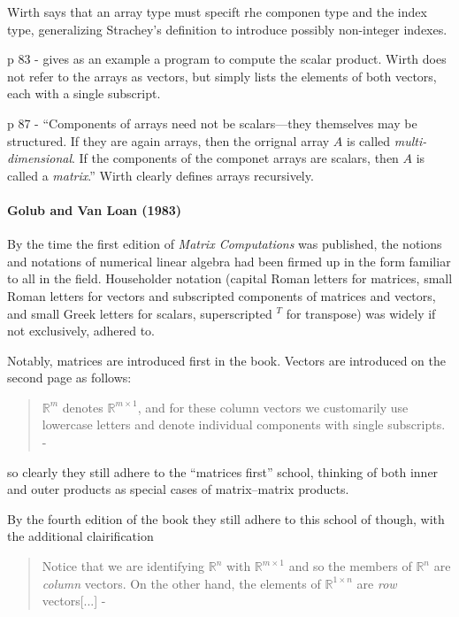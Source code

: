 Wirth says that an array type must specift rhe componen type and the index type,
generalizing Strachey's definition to introduce possibly non-integer indexes.

p 83 - gives as an example a program to compute the scalar product.
Wirth does not refer to the arrays as vectors, but simply lists the elements of
both vectors, each with a single subscript.

p 87 - ``Components of arrays need not be scalars---they themselves may be structured.
If they are again arrays, then the orrignal array $A$ is called \textit{multi-dimensional}.
If the components of the componet arrays are scalars, then
$A$ is called a \textit{matrix}.'' Wirth clearly defines arrays recursively.



\paragraph{Golub and Van Loan (1983)~\cite{Golub1983}}

By the time the first edition of \textit{Matrix Computations} was published,
the notions and notations of numerical linear algebra had been firmed up in the
form familiar to all in the field. Householder notation (capital Roman letters
for matrices, small Roman letters for vectors and subscripted components of matrices and vectors,
and small Greek letters for scalars, superscripted $^T$ for transpose) was widely
if not exclusively, adhered to.

Notably, matrices are introduced first in the book.
Vectors are introduced on the second page as follows:
%
\begin{quote}
$\mathbb R^m$ denotes $\mathbb R^{m\times1}$, and for these column vectors we customarily use
lowercase letters and denote individual components with single subscripts.
- \cite[p. 2]{Golub1983}
\end{quote}
%
so clearly they still adhere to the ``matrices first'' school, thinking of both
inner and outer products as special cases of matrix--matrix products.


By the fourth edition of the book they still adhere to this school of though,
with the additional clairification
%
\begin{quote}
Notice that we are identifying $\mathbb R^n$ with $\mathbb R^{m\times1}$ and so the members of $\mathbb R^n$ are
\textit{column} vectors. On the other hand, the elements of $\mathbb R^{1\times n}$ are \textit{row} vectors[...]
- \cite[p. 3]{Golub2013}
\end{quote}
%

